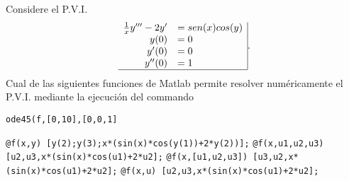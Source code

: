 \begin{pregunta}
\begin{cuerpo}
Considere el P.V.I.
$$
\begin{array}{rl|}
\frac{1}{x}y'''-2y'	&=sen(x)cos(y)\\
y(0)	&=0\\
y'(0)	&=0\\
y''(0)	&=1\\ \hline
\end{array}.
$$
Cual de las siguientes funciones de Matlab permite resolver num\'ericamente el P.V.I. mediante la ejecuci\'on del commando 
\begin{center}
\texttt{ode45(f,[0,10],[0,0,1]}
\end{center}
\end{cuerpo}
\begin{alternativas}
{\texttt{@f(x,y) [y(2);y(3);x*(sin(x)*cos(y(1))+2*y(2))];}}
{\texttt{@f(x,u1,u2,u3) [u2,u3,x*(sin(x)*cos(u1)+2*u2];}}
{\texttt{@f(x,[u1,u2,u3]) [u3,u2,x*(sin(x)*cos(u1)+2*u2];}}
{\texttt{@f(x,u) [u2,u3,x*(sin(x)*cos(u1)+2*u2];}}
\end{alternativas}
\justificacion{7cm}
\end{pregunta}